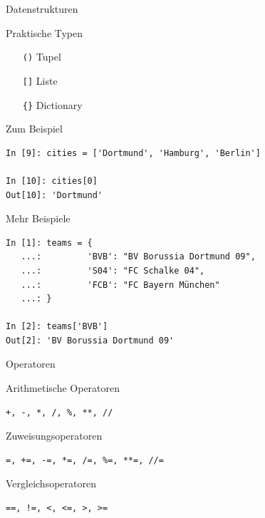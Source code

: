 \begin{frame}[fragile]{Datenstrukturen}
  \begin{block}{Praktische Typen}
    \begin{itemize}
      \item[\texttt{()}] Tupel
      \item[\texttt{[]}] Liste
      \item[\texttt{\{\}}] Dictionary 
    \end{itemize}
  \end{block}
  \vspace{.5em}
  \begin{spacing}{1.0}
    \begin{exampleblock}{Zum Beispiel}
      \begin{verbatim}
In [9]: cities = ['Dortmund', 'Hamburg', 'Berlin']

In [10]: cities[0]
Out[10]: 'Dortmund'
      \end{verbatim}
    \end{exampleblock}
  \end{spacing}
\end{frame}

\begin{frame}[fragile]{Mehr Beispiele}
  \begin{verbatim}
In [1]: teams = {
   ...:         'BVB': "BV Borussia Dortmund 09",
   ...:         'S04': "FC Schalke 04",
   ...:         'FCB': "FC Bayern München"
   ...: }

In [2]: teams['BVB']
Out[2]: 'BV Borussia Dortmund 09'
  \end{verbatim}
\end{frame}

\begin{frame}[fragile]{Operatoren}
  \begin{spacing}{1.0}
    \begin{block}{Arithmetische Operatoren}
      \begin{verbatim}
+, -, *, /, %, **, //
      \end{verbatim}
    \end{block}
    \begin{block}{Zuweisungsoperatoren}
      \begin{verbatim}
=, +=, -=, *=, /=, %=, **=, //=
      \end{verbatim}
    \end{block}
    \begin{block}{Vergleichsoperatoren}
      \begin{verbatim}
==, !=, <, <=, >, >=
      \end{verbatim}
    \end{block}
  \end{spacing}
\end{frame}

